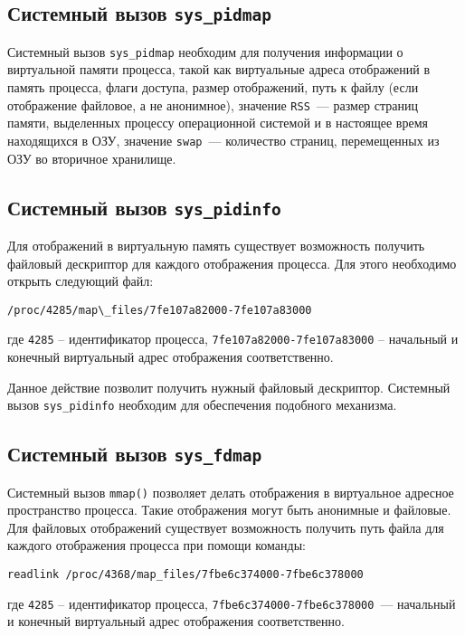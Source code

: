 \subsection{Системный вызов \texttt{sys\_pidmap}}
\label{sub:sys:sys_pidmap}

Системный вызов \texttt{sys\_pidmap} необходим для получения информации о
виртуальной памяти процесса, такой как виртуальные адреса отображений в память
процесса, флаги доступа, размер отображений, путь к файлу (если отображение
файловое, а не анонимное), значение \texttt{RSS}~--- размер страниц памяти,
выделенных процессу операционной системой и в настоящее время находящихся в ОЗУ,
значение \texttt{swap}~--- количество страниц, перемещенных из ОЗУ во вторичное
хранилище. 

\subsection{Системный вызов \texttt{sys\_pidinfo}}
\label{sub:sys:sys_pidinfo}

Для отображений в виртуальную память существует возможность получить файловый
дескриптор для каждого отображения процесса. Для этого необходимо открыть
следующий файл:

\medskip
\begin{lstlisting}[style=cstyle]
/proc/4285/map\_files/7fe107a82000-7fe107a83000
\end{lstlisting}
\medskip
где \texttt{4285} -- идентификатор процесса,
\texttt{7fe107a82000-7fe107a83000} -- начальный и конечный виртуальный адрес
отображения соответственно.

Данное действие позволит получить нужный файловый дескриптор. Системный вызов
\texttt{sys\_pidinfo} необходим для обеспечения подобного механизма. 

\subsection{Системный вызов \texttt{sys\_fdmap}}
\label{sub:sys:sys_fdmap}

Системный вызов \texttt{mmap()} позволяет делать отображения в виртуальное
адресное пространство процесса. Такие отображения могут быть анонимные и
файловые. Для файловых отображений существует возможность получить путь файла
для каждого отображения процесса при помощи команды: 

\medskip
\begin{lstlisting}[style=cstyle]
 readlink /proc/4368/map_files/7fbe6c374000-7fbe6c378000
\end{lstlisting}
\medskip
где \texttt{4285} -- идентификатор процесса,
\texttt{7fbe6c374000-7fbe6c378000}~--- начальный и конечный виртуальный адрес
отображения соответственно. 

